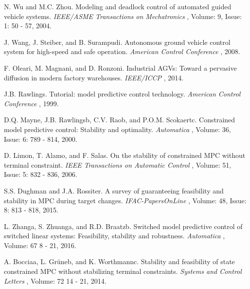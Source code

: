  
\begin{thebibliography}{xx}  %

N. Wu and M.C. Zhou.
\newblock Modeling and deadlock control of automated guided vehicle systems.
\newblock \emph{ IEEE/ASME Transactions on Mechatronics }, Volume: 9, Issue: 1: 50 - 57, 2004.

J. Wang, J. Steiber, and B. Surampudi.
\newblock Autonomous ground vehicle control system for high-speed and safe operation.
\newblock \emph{ American Control Conference }, 2008.


F. Oleari, M. Magnani, and D. Ronzoni.
\newblock Industrial AGVs: Toward a pervasive diffusion in modern factory warehouses.
\newblock \emph{ IEEE/ICCP }, 2014.


J.B. Rawlings.
\newblock Tutorial: model predictive control technology.
\newblock \emph{  American Control Conference }, 1999.

D.Q. Mayne, J.B. Rawlingsb, C.V. Raob, and P.O.M. Scokaertc.
\newblock Constrained model predictive control: Stability and optimality.
\newblock \emph{  Automatica }, Volume: 36, Issue: 6: 789 - 814, 2000.

D. Limon, T. Alamo, and F. Salas.
\newblock On the stability of constrained MPC without terminal constraint.
\newblock \emph{   IEEE Transactions on Automatic Control }, Volume: 51, Issue: 5: 832 - 836, 2006.

S.S. Dughman and J.A. Rossiter.
\newblock A survey of guaranteeing feasibility and stability in MPC during target changes.
\newblock \emph{   IFAC-PapersOnLine }, Volume: 48, Issue: 8: 813 - 818, 2015.

L. Zhanga, S. Zhuanga, and R.D. Braatzb.
\newblock Switched model predictive control of switched linear systems:
Feasibility, stability and robustness.
\newblock \emph{  Automatica  }, Volume: 67 8 - 21, 2016.

A. Bocciaa, L. Grüneb, and K. Worthmannc.
\newblock Stability and feasibility of state constrained MPC without stabilizing terminal constraints.
\newblock \emph{  Systems and Control Letters  }, Volume: 72 14 - 21, 2014.




\end{thebibliography}
